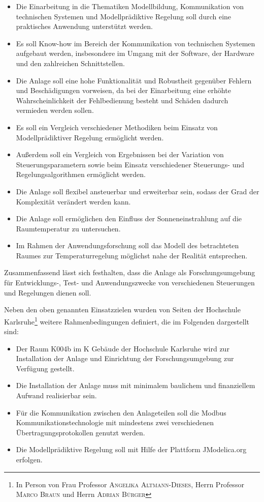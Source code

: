 \begin{itemize}
	\item Die Einarbeitung in die Thematiken Modellbildung, Kommunikation von technischen Systemen und Modellprädiktive Regelung soll durch eine praktisches Anwendung unterstützt werden.
	\item Es soll Know-how im Bereich der Kommunikation von technischen Systemen aufgebaut werden, insbesondere im Umgang mit der Software, der Hardware und den zahlreichen Schnittstellen.
	\item Die Anlage soll eine hohe Funktionalität und Robustheit gegenüber Fehlern und Beschädigungen vorweisen, da bei der Einarbeitung eine erhöhte Wahrscheinlichkeit der Fehlbedienung besteht und Schäden dadurch vermieden werden sollen.
	\item Es soll ein Vergleich verschiedener Methodiken beim Einsatz von Modellprädiktiver Regelung ermöglicht werden.
	\item Außerdem soll ein Vergleich von Ergebnissen bei der Variation von Steuerungsparametern sowie beim Einsatz verschiedener Steuerungs- und Regelungsalgorithmen ermöglicht werden.
	\item Die Anlage soll flexibel ansteuerbar und erweiterbar sein, sodass der Grad der Komplexität verändert werden kann.
	\item Die Anlage soll ermöglichen den Einfluss der Sonneneinstrahlung auf die Raumtemperatur zu untersuchen.
	\item Im Rahmen der Anwendungsforschung soll das Modell des betrachteten Raumes zur Temperaturregelung möglichst nahe der Realität entsprechen.
\end{itemize}

Zusammenfassend lässt sich festhalten, dass die Anlage als Forschungsumgebung für Entwicklungs-, Test- und Anwendungszwecke von verschiedenen Steuerungen und Regelungen dienen soll.

Neben den oben genannten Einsatzzielen wurden von Seiten der Hochschule Karlsruhe\footnote{In Person von Frau Professor \textsc{Angelika Altmann-Dieses}, Herrn Professor \textsc{Marco Braun} und Herrn \textsc{Adrian Bürger}} weitere Rahmenbedingungen definiert, die im Folgenden dargestellt sind:

\begin{itemize}
	\item Der Raum K004b im K Gebäude der Hochschule Karlsruhe wird zur Installation der Anlage und Einrichtung der Forschungsumgebung zur Verfügung gestellt.
	\item Die Installation der Anlage muss mit minimalem baulichem und finanziellem Aufwand realisierbar sein.
	\item Für die Kommunikation zwischen den Anlageteilen soll die Modbus Kommunikationstechnologie mit mindestens zwei verschiedenen Übertragungsprotokollen genutzt werden.
	\item Die Modellprädiktive Regelung soll mit Hilfe der Plattform JModelica.org erfolgen.
\end{itemize}

